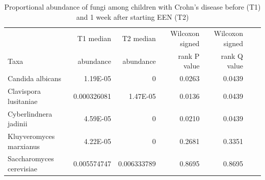{\footnotesize
	\renewcommand{\arraystretch}{0.7} \setlength{\tabcolsep}{3pt}
	\begin{longtable}{ | l | r | r | r | r | r | r  | }
		\caption[  Proportional abundance of fungi among children with Crohn’s disease before (T1) and 1 week after starting EEN (T2) ]{  Proportional abundance of fungi among children with Crohn’s disease before (T1) and 1 week after starting EEN (T2)	} 
		\label{TS13} \\
		
		\hline 
		& T1  median& T2  median & Wilcoxon signed  & Wilcoxon signed \\ 
		Taxa & abundance & abundance & rank P value & rank Q value \\
		\hline 
		\endfirsthead
		
		
		\endfoot
		
		\hline 
		\endlastfoot
		
		Candida albicans & 1.19E-05 & 0 & 0.0263 & 0.0439 \\ 
		Clavispora lusitaniae & 0.000326081 & 1.47E-05 & 0.0136 & 0.0439 \\ 
		Cyberlindnera jadinii & 4.59E-05 & 0 & 0.0210 & 0.0439 \\ 
		Kluyveromyces marxianus & 4.22E-05 & 0 & 0.2681 & 0.3351 \\ 
		Saccharomyces cerevisiae & 0.005574747 & 0.006333789 & 0.8695 & 0.8695
		
	\end{longtable}
}




